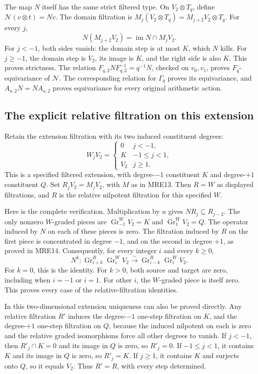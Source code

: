 The map \(N\) itself has the same strict filtered type. On
\(V_2\otimes T_q\), define \(\mathcal N(v\otimes t)=Nv\).
The domain filtration is \(M_j(V_2\otimes T_q)=M_{j+2}V_2\otimes T_q\).
For every \(j\),
\[
 N(M_{j+2}V_2)=\operatorname{im}N\cap M_jV_2.
 \tag{MRE27}
\]
For \(j<-1\), both sides vanish: the domain step is at most \(K\),
which \(N\) kills. For \(j\geq-1\), the domain step is \(V_2\), its
image is \(K\), and the right side is also \(K\). This proves strictness.
The relation \(F_{q,2}NF_{q,2}^{-1}=q^{-1}N\), checked on \(v_0,v_1\),
proves \(F_q\)-equivariance of \(\mathcal N\). The corresponding relation
for \(\Gamma_q\) proves its equivariance, and \(A_{a,2}N=NA_{a,2}\)
proves equivariance for every original arithmetic action.

\subsection{The explicit relative filtration on this extension}

Retain the extension filtration with its two induced constituent degrees:
\[
 W_jV_2=
 \begin{cases}
 0&j<-1,\\K&-1\leq j<1,\\V_2&j\geq1.
 \end{cases}
 \tag{MRE28}
\]
This is a specified filtered extension, with degree-\(-1\) constituent
\(K\) and degree-\(+1\) constituent \(Q\). Set \(R_jV_2=M_jV_2\), with
\(M\) as in MRE13. Then \(R=W\) as displayed filtrations, and \(R\) is
the relative nilpotent filtration for this specified \(W\).

Here is the complete verification. Multiplication by \(u\) gives
\(NR_j\subseteq R_{j-2}\). The only nonzero \(W\)-graded pieces are
\(\operatorname{Gr}_{-1}^W V_2=K\) and
\(\operatorname{Gr}_{1}^W V_2=Q\). The operator induced by \(N\) on
each of these pieces is zero. The filtration induced by \(R\) on the
first piece is concentrated in degree \(-1\), and on the second in
degree \(+1\), as proved in MRE14. Consequently, for every integer
\(i\) and every \(k\geq0\),
\[
 N^k:\operatorname{Gr}_{i+k}^R\operatorname{Gr}_i^W V_2
 \xrightarrow{\sim}
       \operatorname{Gr}_{i-k}^R\operatorname{Gr}_i^W V_2.
 \tag{MRE29}
\]
For \(k=0\), this is the identity. For \(k>0\), both source and target
are zero, including when \(i=-1\) or \(i=1\). For other \(i\), the
\(W\)-graded piece is itself zero. This proves every case of the
relative-filtration identities.

In this two-dimensional extension uniqueness can also be proved directly.
Any relative filtration \(R'\) induces the degree-\(-1\) one-step
filtration on \(K\), and the degree-\(+1\) one-step filtration on \(Q\),
because the induced nilpotent on each is zero and the relative graded
isomorphisms force all other degrees to vanish. If \(j<-1\), then
\(R'_j\cap K=0\) and its image in \(Q\) is zero, so \(R'_j=0\).
If \(-1\leq j<1\), it contains \(K\) and its image in \(Q\) is zero,
so \(R'_j=K\). If \(j\geq1\), it contains \(K\) and surjects onto
\(Q\), so it equals \(V_2\). Thus \(R'=R\), with every step determined.

